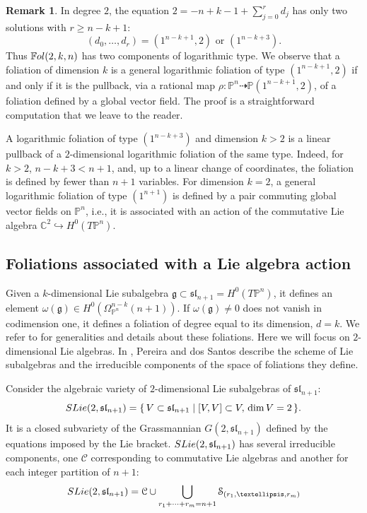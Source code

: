 \documentclass[twoside]{amsart}
\numberwithin{equation}{section}
\newcommand{\pn}{{\mathbb{P}^{n}}}
\newcommand{\tpn}{T{\mathbb{P}^{n}}}
\newcommand{\sln}{\mathfrak{sl}}
\newcommand{\mf}[1]{\mathfrak{#1}}
\def\PP{{\mathbb{P}}}
\def\CC{{\mathbb{C}}}
\newcommand{\Fol}{\mathbb{F}{\rm ol}}
\theoremstyle{definition}
\newtheorem{remark}{Remark}[section]
\begin{document}
\begin{remark}\label{rem:log(1,2)}
In degree $2$, the equation $2 = -n+k-1 + \sum_{j=0}^{r} d_j$ has only two solutions with $r\geq n-k+1$: 
\[
(d_0, \dots , d_{r}) = (1^{n-k+1}, 2) \text{ or } (1^{n-k+3}).
\]
Thus $\Fol(2,k,n)$ has two components of logarithmic type. We observe that a foliation of dimension $k$ is a general logarithmic foliation of type $(1^{n-k+1},2)$ if and only if it is the pullback, via a rational map $\rho\colon \pn \dashrightarrow \PP(1^{n-k+1},2)$, of a foliation defined by a global vector field. The proof is a straightforward computation that we leave to the reader. 

A logarithmic foliation of type $(1^{n-k+3})$ and dimension $k>2$ is a linear pullback of a $2$-dimensional logarithmic foliation of the same type. Indeed, for $k>2$, $n-k+3 < n+1$, and, up to a linear change of coordinates, the foliation is defined by fewer than $n+1$ variables. For dimension $k=2$, a general logarithmic foliation of type $(1^{n+1})$ is defined by a pair commuting global vector fields on $\pn$, i.e., it is associated with an action of the commutative Lie algebra $\CC^2\hookrightarrow H^0(\tpn)$. 
\end{remark}

\subsection{Foliations associated with a Lie algebra action}\label{sec:lie-alg-fols}
Given a $k$-dimensional Lie subalgebra $\mf{g} \subset \mf{sl}_{n+1} =  H^0(\tpn)$, it defines an element $\omega(\mf{g}) \in H^0(\Omega_{\pn}^{n-k}(n+1))$. If $\omega(\mf{g})\neq 0$ does not vanish in codimension one, it defines a foliation of degree equal to its dimension, $d=k$. We refer to \cite{CD2,CP1,PdS} for generalities and details about these foliations. Here we will focus on $2$-dimensional Lie algebras. In \cite{PdS}, Pereira and dos Santos describe the scheme of Lie subalgebras and the irreducible components of the space of foliations they define.




Consider the algebraic variety of $2$-dimensional Lie subalgebras of $\sln_{n+1}$: 
\[
{\rm SLie }(2, \sln_{n+1}) = \{\,V \subset \sln_{n+1} \mid [V,V]\subset V, \, \dim V = 2 \,\}.
\]
It is a closed subvariety of the Grassmannian $G(2, \sln_{n+1})$ defined by the equations imposed by the Lie bracket. ${\rm SLie }(2, \sln_{n+1})$ has several irreducible components, one $\mathcal{C}$ corresponding to commutative Lie algebras and another for each integer partition of $n+1$:
\[
{\rm SLie }(2, \sln_{n+1}) = \mathcal{C} \cup \bigcup_{r_1+\cdots +r_m = n+1}\mathcal{S}_{(r_1, \dots, r_m)}
\]
\end{document}
